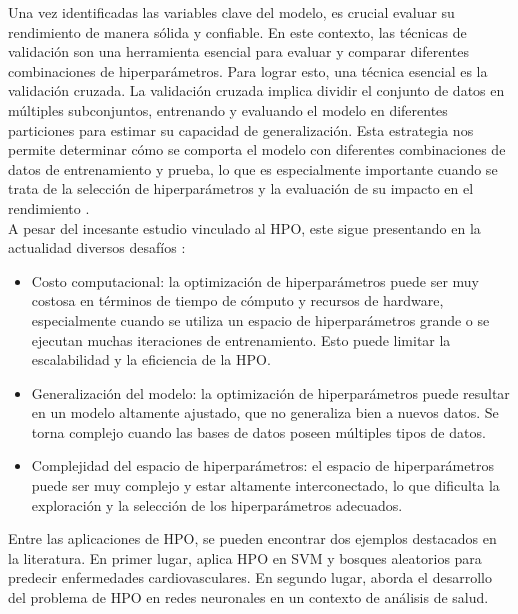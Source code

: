 Una vez identificadas las variables clave del modelo, es crucial evaluar su rendimiento de manera sólida y confiable. En este contexto, las técnicas de validación son una herramienta esencial para evaluar y comparar diferentes combinaciones de hiperparámetros. Para lograr esto, una técnica esencial es la validación cruzada. La validación cruzada implica dividir el conjunto de datos en múltiples subconjuntos, entrenando y evaluando el modelo en diferentes particiones para estimar su capacidad de generalización. Esta estrategia nos permite determinar cómo se comporta el modelo con diferentes combinaciones de datos de entrenamiento y prueba, lo que es especialmente importante cuando se trata de la selección de hiperparámetros y la evaluación de su impacto en el rendimiento \citep{hastie2009elements}. \\
A pesar del incesante estudio vinculado al HPO, este sigue presentando en la actualidad diversos desafíos \citep{hutter2019automated}:
\begin{itemize}
	\item Costo computacional: la optimización de hiperparámetros puede ser muy costosa en términos de tiempo de cómputo y recursos de hardware, especialmente cuando se utiliza un espacio de hiperparámetros grande o se ejecutan muchas iteraciones de entrenamiento. Esto puede limitar la escalabilidad y la eficiencia de la HPO.
	\item Generalización del modelo: la optimización de hiperparámetros puede resultar en un modelo altamente ajustado, que no generaliza bien a nuevos datos. Se torna complejo cuando las bases de datos poseen múltiples tipos de datos.
	\item Complejidad del espacio de hiperparámetros: el espacio de hiperparámetros puede ser muy complejo y estar altamente interconectado, lo que dificulta la exploración y la selección de los hiperparámetros adecuados.
\end{itemize}

Entre las aplicaciones de HPO, se pueden encontrar dos ejemplos destacados en la literatura. En primer lugar, \citep{hernandeztecnicas} aplica HPO en SVM y bosques aleatorios para predecir enfermedades cardiovasculares. En segundo lugar, \citep{waring2020automated} aborda el desarrollo del problema de HPO en redes neuronales en un contexto de análisis de salud.


